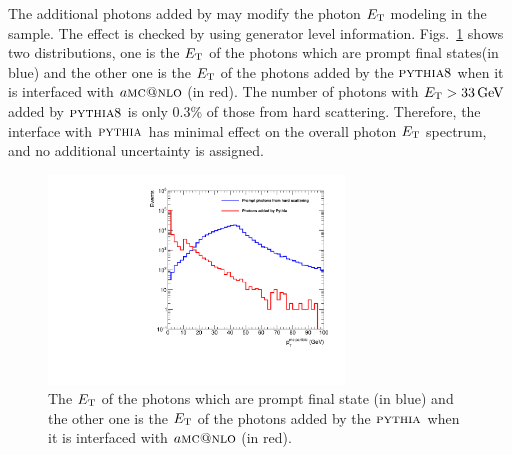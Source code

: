 The additional photons added by \PYTHIA may modify the photon $E_{\mathrm{T}}$ modeling in the sample. The effect is checked by using generator level information.
		Figs.~\ref{fig:ZGPYTHIA} shows two distributions, one is the $E_{\mathrm{T}}$ of the photons which are prompt final states\footnotemark (in blue) and the other one is the $E_{\mathrm{T}}$ of the photons added by the ${\textsc{pythia}}8$ when it is interfaced with $a\textsc{mc@nlo}$ (in red). The number of photons with $E_{\mathrm{T}} > 33 \,\text{Ge\hspace{-.08em}V}$ added by ${\textsc{pythia}}8$ is only 0.3\% of those from hard scattering. Therefore, the interface with ${\textsc{pythia}}$ has minimal effect on the overall photon $E_{\mathrm{T}}$ spectrum, and no additional uncertainty is assigned.
		\begin{figure}[!ht]
		\begin{center}
		  \includegraphics[width=0.7\textwidth]{Fig/mcPt_FromMEPythia}
		  \caption{The $E_{\mathrm{T}}$ of the photons which are prompt final state (in blue) and the other one is the $E_{\mathrm{T}}$ of the photons added by the ${\textsc{pythia}}$ when it is interfaced with $a\textsc{mc@nlo}$ (in red).}
		\label{fig:ZGPYTHIA}
		\end{center}
		\end{figure}

